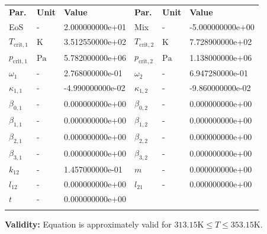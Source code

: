 \begin{longtable}[l]{lll|lll}
\toprule
\addlinespace
\textbf{Par.} & \textbf{Unit} & \textbf{Value} &	\textbf{Par.} & \textbf{Unit} & \textbf{Value} \\
\addlinespace
\midrule
\endhead

\bottomrule
\endfoot
\bottomrule
\endlastfoot
\addlinespace

EoS & - & 2.000000000e+01 & Mix & - & -5.000000000e+00 \\
$T_\mathrm{crit,1}$ & $\si{\kelvin}$ & 3.512550000e+02 & $T_\mathrm{crit,2}$ & $\si{\kelvin}$ & 7.728900000e+02 \\
$p_\mathrm{crit,1}$ & $\si{\pascal}$ & 5.782000000e+06 & $p_\mathrm{crit,2}$ & $\si{\pascal}$ & 1.138000000e+06 \\
$\omega_{1}$ & - & 2.768000000e-01 & $\omega_{2}$ & - & 6.947280000e-01 \\
$\kappa_{1,1}$ & - & -4.990000000e-02 & $\kappa_{1,2}$ & - & -9.860000000e-02 \\
$\beta_{0,1}$ & - & 0.000000000e+00 & $\beta_{0,2}$ & - & 0.000000000e+00 \\
$\beta_{1,1}$ & - & 0.000000000e+00 & $\beta_{1,2}$ & - & 0.000000000e+00 \\
$\beta_{2,1}$ & - & 0.000000000e+00 & $\beta_{2,2}$ & - & 0.000000000e+00 \\
$\beta_{3,1}$ & - & 0.000000000e+00 & $\beta_{3,2}$ & - & 0.000000000e+00 \\
$k_{12}$ & - & 1.457000000e-01 & $m$ & - & 0.000000000e+00 \\
$l_{12}$ & - & 0.000000000e+00 & $l_{21}$ & - & 0.000000000e+00 \\
$t$ & - & 0.000000000e+00 & & & \\

\addlinespace\end{longtable}

\textbf{Validity:}
\newline
Equation is approximately valid for $313.15 \si{\kelvin} \leq T \leq 353.15 \si{\kelvin}$.
\newline

